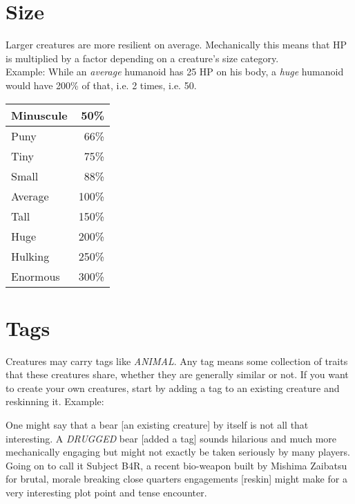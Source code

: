 \documentclass[12pt,a4paper,openany]{book}
\begin{document}
	\section{Size}
	Larger creatures are more resilient on average. Mechanically this means that HP is multiplied by a factor depending on a creature's size category.\\
	Example: While an \emph{average} humanoid has 25 HP on his body, a \emph{huge} humanoid would have 200\% of that, i.e. 2 times, i.e. 50.\\
	\begin{center}
	\begin{tabular}{|l|r|}
		\hline
		Minuscule &  50\% \\ \hline
		Puny      &  66\% \\ \hline
		Tiny      &  75\% \\ \hline
		Small     &  88\% \\ \hline
		Average   & 100\% \\ \hline
		Tall      & 150\% \\ \hline
		Huge      & 200\% \\ \hline
		Hulking   & 250\% \\ \hline
		Enormous  & 300\% \\ \hline
	\end{tabular}
	\end{center}

	\section{Tags}
	Creatures may carry tags like \emph{ANIMAL}. Any tag means some collection of traits that these creatures share, whether they are generally similar or not. If you want to create your own creatures, start by adding a tag to an existing creature and reskinning it. Example:\par
	\begin{exampleblock}
		One might say that a bear [an existing creature] by itself is not all that interesting. A \emph{DRUGGED} bear [added a tag] sounds hilarious and much more mechanically engaging but might not exactly be taken seriously by many players. Going on to call it Subject B4R, a recent bio-weapon built by Mishima Zaibatsu for brutal, morale breaking close quarters engagements [reskin] might make for a very interesting plot point and tense encounter.
	\end{exampleblock}
	
	\vspace{5mm}
	
\end{document}

